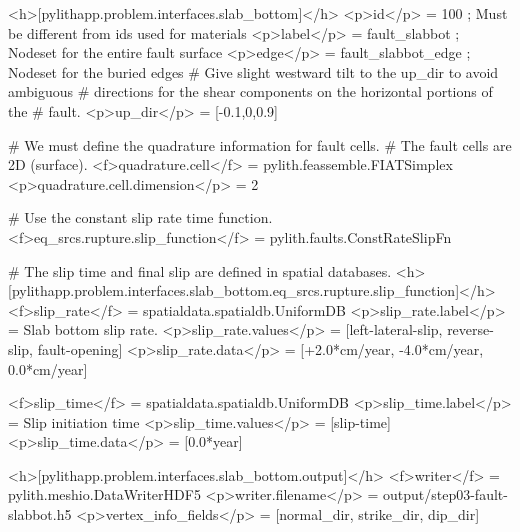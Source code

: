 \begin{cfg}
<h>[pylithapp.problem.interfaces.slab_bottom]</h>
<p>id</p> = 100 ; Must be different from ids used for materials
<p>label</p> = fault_slabbot ; Nodeset for the entire fault surface
<p>edge</p> = fault_slabbot_edge ; Nodeset for the buried edges
# Give slight westward tilt to the up_dir to avoid ambiguous
# directions for the shear components on the horizontal portions of the
# fault.
<p>up_dir</p> = [-0.1,0,0.9]

# We must define the quadrature information for fault cells.
# The fault cells are 2D (surface).
<f>quadrature.cell</f> = pylith.feassemble.FIATSimplex
<p>quadrature.cell.dimension</p> = 2

# Use the constant slip rate time function.
<f>eq_srcs.rupture.slip_function</f> = pylith.faults.ConstRateSlipFn

# The slip time and final slip are defined in spatial databases.
<h>[pylithapp.problem.interfaces.slab_bottom.eq_srcs.rupture.slip_function]</h>
<f>slip_rate</f> = spatialdata.spatialdb.UniformDB
<p>slip_rate.label</p> = Slab bottom slip rate.
<p>slip_rate.values</p> = [left-lateral-slip, reverse-slip, fault-opening]
<p>slip_rate.data</p> = [+2.0*cm/year, -4.0*cm/year, 0.0*cm/year]

<f>slip_time</f> = spatialdata.spatialdb.UniformDB
<p>slip_time.label</p>  = Slip initiation time
<p>slip_time.values</p> = [slip-time]
<p>slip_time.data</p> = [0.0*year] 

<h>[pylithapp.problem.interfaces.slab_bottom.output]</h>
<f>writer</f> = pylith.meshio.DataWriterHDF5
<p>writer.filename</p> = output/step03-fault-slabbot.h5
<p>vertex_info_fields</p> = [normal_dir, strike_dir, dip_dir]
\end{cfg}


